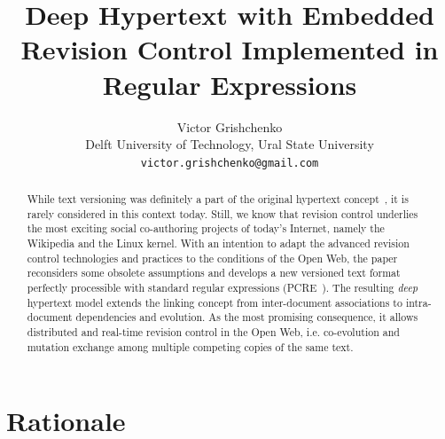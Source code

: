 \documentclass{acm_proc_article-sp}
\date{}
\begin{document}
\title{Deep Hypertext with Embedded Revision Control Implemented in Regular Expressions}

\author{Victor Grishchenko \\ \small Delft University of Technology, Ural State University \\ {\tt victor.grishchenko@gmail.com} }

\maketitle

\begin{abstract}
While text versioning was definitely a part of the original
hypertext concept~\cite{nls,literary,hyp-ed-sys},
it is rarely considered in this context today.
Still, we know that revision control underlies the most exciting
social co-authoring projects of today's Internet, namely the
Wikipedia and the Linux kernel. With an intention to adapt the
advanced revision control technologies and practices to the
conditions of the Open Web, the paper reconsiders some obsolete
assumptions and develops a new versioned text format perfectly
processible with standard regular expressions (PCRE~\cite{pcre}).
The resulting \emph{deep} hypertext model extends the linking
concept from inter-document associations to intra-document
dependencies and evolution. As the most promising consequence,
it allows distributed and real-time revision control in the Open
Web, i.e. co-evolution and mutation exchange among multiple
competing copies of the same text. 

\end{abstract}


\section{Rationale}
\end{document}
